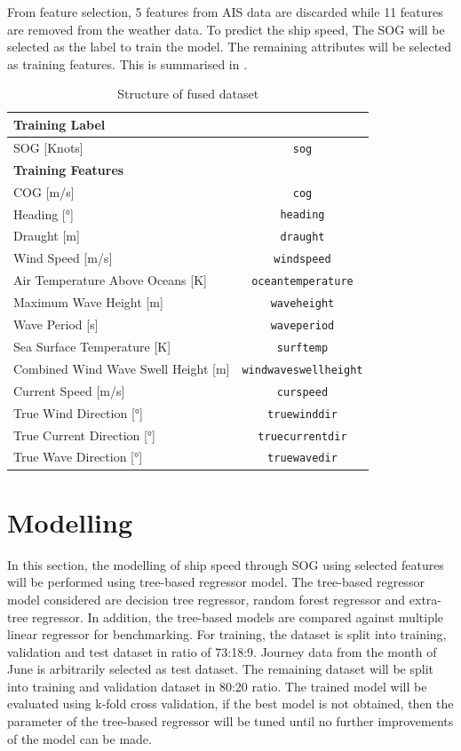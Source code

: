 From feature selection, 5 features from AIS data are discarded while 11 features are removed from the weather data. To predict the ship speed, The SOG will be selected as the label to train the model. The remaining attributes will be selected as training features. This is summarised in .
\begin{table}
    \footnotesize
    \centering
    {\begin{tabular}{ p{8cm}c }
    \hline
    \multicolumn{2}{l}{\textbf{Training Label}}\\
    \hline
    SOG [Knots] & {\tt sog} \\
    \hline
    \multicolumn{2}{l}{\textbf{Training Features}}\\
    \hline
    COG [m/s] & {\tt cog}  \\
    Heading [°] & {\tt heading}  \\
    Draught [m] & {\tt draught} \\
    Wind Speed [m/s] & {\tt windspeed} \\
    Air Temperature Above Oceans [K] & {\tt oceantemperature} \\
    Maximum Wave Height [m] & {\tt waveheight} \\
    Wave Period [s] & {\tt waveperiod}\\
    Sea Surface Temperature [K] & {\tt surftemp}\\
    Combined Wind Wave Swell Height [m] &  {\tt windwaveswellheight} \\
    Current Speed [m/s] & {\tt curspeed} \\
    True Wind Direction [°] & {\tt truewinddir}  \\
    True Current Direction [°] & {\tt truecurrentdir} \\
    True Wave Direction [°] & {\tt truewavedir} \\
    \hline
    \end{tabular}}
\caption{Structure of fused dataset}\label{tbl:dataset_train_struct}
\end{table}

\section{Modelling}\label{sec:modelling}

In this section, the modelling of ship speed through SOG using selected features will be performed using tree-based regressor model. The tree-based regressor model considered are decision tree regressor, random forest regressor and extra-tree regressor. In addition, the tree-based models are compared against multiple linear regressor for benchmarking. For training, the dataset is split into training, validation and test dataset in ratio of 73:18:9. Journey data from the month of June is arbitrarily selected as test dataset. The remaining dataset will be split into training and validation dataset in 80:20 ratio. The trained model will be evaluated using k-fold cross validation, if the best model is not obtained, then the parameter of the tree-based regressor will be tuned until no further improvements of the model can be made.\\


